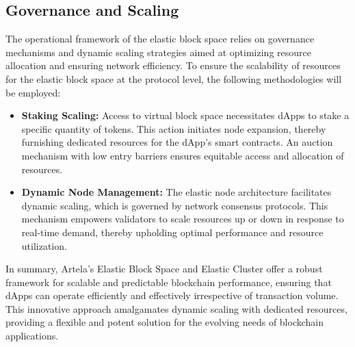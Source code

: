 \subsection{Governance and Scaling}

The operational framework of the elastic block space relies on governance mechanisms and dynamic scaling strategies aimed at optimizing resource allocation and ensuring network efficiency. To ensure the scalability of resources for the elastic block space at the protocol level, the following methodologies will be employed:

\begin{itemize}
\item \textbf{Staking Scaling:} Access to virtual block space necessitates dApps to stake a specific quantity of tokens. This action initiates node expansion, thereby furnishing dedicated resources for the dApp’s smart contracts. An auction mechanism with low entry barriers ensures equitable access and allocation of resources.
\item \textbf{Dynamic Node Management:} The elastic node architecture facilitates dynamic scaling, which is governed by network consensus protocols. This mechanism empowers validators to scale resources up or down in response to real-time demand, thereby upholding optimal performance and resource utilization.
\end{itemize}

In summary, Artela's Elastic Block Space and Elastic Cluster offer a robust framework for scalable and predictable blockchain performance, ensuring that dApps can operate efficiently and effectively irrespective of transaction volume. This innovative approach amalgamates dynamic scaling with dedicated resources, providing a flexible and potent solution for the evolving needs of blockchain applications.
